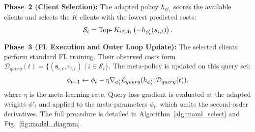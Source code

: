 \documentclass[journal]{IEEEtran}
\newcommand{\revision}[1]{#1}
\begin{document}
\textbf{Phase~2 (Client Selection):}
\revision{The adapted policy $h_{\phi'_t}$ scores the available clients and selects the $K$ clients with the lowest predicted costs:}
\begin{equation}
	\color{black}
	\mathcal{S}_t = \operatorname{Top-}K_{i \in \mathcal{A}_t} \left( -h_{\phi'_t}(\bm{s}_{i,t}) \right).
	\label{eq:selection}
\end{equation}

\textbf{Phase~3 (FL Execution and Outer Loop Update):}
\revision{The selected clients perform standard FL training. Their observed costs form $\mathcal{D}_{query}(t)=\{(\bm{s}_{i,t},c_{i,t})\mid i\in\mathcal{S}_t\}$. %
The meta-policy is updated on this query set:}
\begin{equation}
		\color{black}
		\phi_{t+1} \leftarrow \phi_t - \eta \nabla_{\phi'_t} \mathcal{L}_{query}(h_{\phi'_t}; \mathcal{D}_{query}(t)),
		\label{eq:outer_loop}
\end{equation}
\revision{where $\eta$ is the meta-learning rate. %
Query-loss gradient is evaluated at the adapted weights $\phi'_t$ and applied to the meta-parameters $\phi_t$, which omits the second-order derivatives. The full procedure is detailed in Algorithm~\ref{alg:maml_select} and Fig.~\ref{fig:model_diagram}.}
\end{document}
